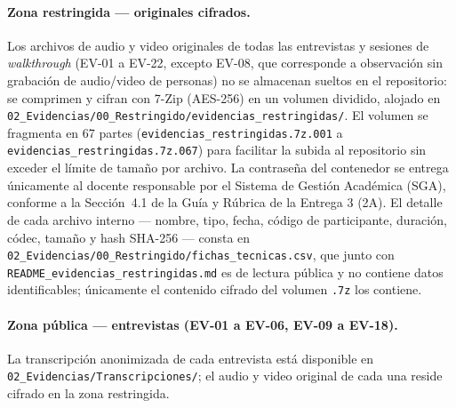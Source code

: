 \documentclass[journal,onecolumn]{IEEEtran}
\begin{document}
	\paragraph{Zona restringida --- originales cifrados.}
	Los archivos de audio y video originales de todas las entrevistas y sesiones
	de \emph{walkthrough} (EV-01 a EV-22, excepto EV-08, que corresponde a
	observación sin grabación de audio/video de personas) no se almacenan
	sueltos en el repositorio: se comprimen y cifran con 7-Zip (AES-256) en un
	volumen dividido, alojado en
	\texttt{02\_Evidencias/00\_Restringido/evidencias\_restringidas/}. El
	volumen se fragmenta en 67 partes
	(\texttt{evidencias\_restringidas.7z.001} a
	\texttt{evidencias\_restringidas.7z.067}) para facilitar la subida al
	repositorio sin exceder el límite de tamaño por archivo. La contraseña del
	contenedor se entrega únicamente al docente responsable por el Sistema de
	Gestión Académica (SGA), conforme a la Sección~4.1 de la Guía y Rúbrica de
	la Entrega 3 (2A). El detalle de cada archivo interno --- nombre, tipo,
	fecha, código de participante, duración, códec, tamaño y hash SHA-256 ---
	consta en \texttt{02\_Evidencias/00\_Restringido/fichas\_tecnicas.csv}, que
	junto con \texttt{README\_evidencias\_restringidas.md} es de lectura
	pública y no contiene datos identificables; únicamente el contenido cifrado
	del volumen \texttt{.7z} los contiene.
	
	\paragraph{Zona pública --- entrevistas (EV-01 a EV-06, EV-09 a EV-18).}
	La transcripción anonimizada de cada entrevista está disponible en
	\texttt{02\_Evidencias/Transcripciones/}; el audio y video original de cada
	una reside cifrado en la zona restringida.
	
\end{document}
